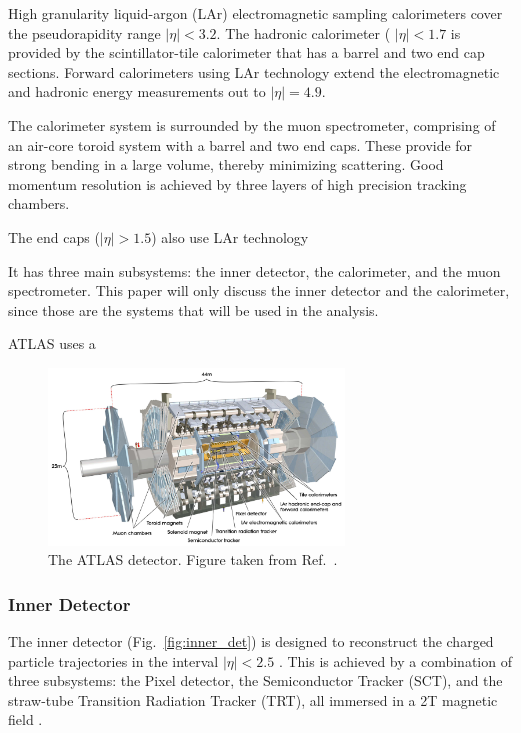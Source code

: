 High granularity liquid-argon (LAr) electromagnetic sampling calorimeters cover the pseudorapidity range $|\eta| < 3.2$. The hadronic calorimeter ( $|\eta| < 1.7$ is provided by the scintillator-tile calorimeter that has a barrel and two end cap sections. Forward calorimeters using LAr technology extend the electromagnetic and hadronic energy measurements out to $|\eta| = 4.9$.

The calorimeter system is surrounded by the muon spectrometer, comprising of an air-core toroid system with a barrel and two end caps. These provide for strong bending in a large volume, thereby minimizing scattering. Good momentum resolution is achieved by three layers of high precision tracking chambers. 



The end caps ($|\eta| > 1.5$) also use LAr technology 


It has three main subsystems: the inner detector, the calorimeter, and the muon spectrometer. This paper will only discuss the inner detector and the calorimeter, since those are the systems that will be used in the analysis.


ATLAS uses a 

\begin{figure}[ht]
	\centering
	\includegraphics[width=0.7\textwidth]{figures/atlas.pdf} %
	\caption{The ATLAS detector. Figure taken from Ref.~\cite{Aad:2008zzm}.}	
	\label{fig:atlas}%
\end{figure}


\subsubsection{Inner Detector}
The inner detector (Fig.~\ref{fig:inner_det}) is designed to reconstruct the charged particle trajectories in the interval $|\eta| < 2.5$ . This is achieved by a combination of three subsystems: the Pixel detector, the Semiconductor Tracker (SCT), and the straw-tube Transition Radiation Tracker (TRT), all immersed in a 2T magnetic field \cite{Aad:2008zzm}.

